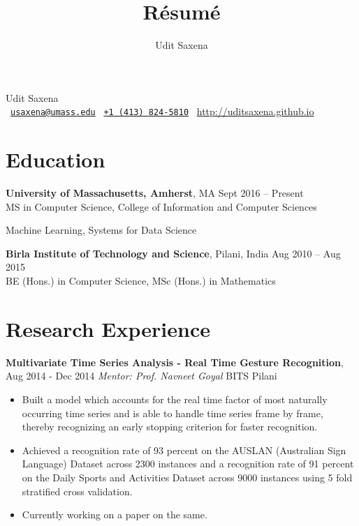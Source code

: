 \documentclass[letterpaper]{article}
\title{R\'esum\'e}
\author{Udit Saxena}
\begin{document}
\pagecolor{white}
\begin{center}
\huge
Udit Saxena\\
\small
\faEnvelope~\href{mailto:usaxena@umass.edu}{\nolinkurl{usaxena@umass.edu}}
\faPhone~\href{tel:14138245810}{\texttt{+1 (413) 824-5810}}
\faGlobe~\url{http://uditsaxena.github.io}
\normalsize
\end{center}

\section*{Education}
\vspace{-1mm}
\textbf{University of Massachusetts, Amherst}, MA \hfill Sept 2016 --
    Present\\
MS in Computer Science, College of Information and Computer Sciences
\vspace{-2mm}
\begin{description}[leftmargin=!, labelwidth=\widthof{Coursework },
        font=\normalfont]
    \item[Coursework:] Machine Learning,
                        Systems for Data Science
\end{description}
\vspace{-0.5mm}
\textbf{Birla Institute of Technology and Science}, Pilani, India \hfill
    Aug 2010 -- Aug 2015\\
BE (Hons.) in Computer Science,
MSc (Hons.) in Mathematics

\section*{Research Experience}
\textbf{Multivariate Time Series Analysis - Real Time Gesture Recognition},  \hfill
Aug 2014 - Dec 2014
\emph{Mentor: Prof. Navneet Goyal} \hfill
BITS Pilani\\
\vspace{-6mm}
\begin{itemize}
\item Built a model which accounts for the real time factor of most naturally occurring time series and is able to handle time series frame by frame, thereby recognizing an early stopping criterion for faster recognition. 
\vspace{-2mm}
\item Achieved a recognition rate of 93 percent on the AUSLAN (Australian Sign Language) Dataset across 2300 instances and a recognition rate of 91 percent on the Daily Sports and Activities Dataset across 9000 instances using 5 fold stratified cross validation.
\vspace{-2mm}
\item Currently working on a paper on the same.
\end{itemize}
\end{document}
